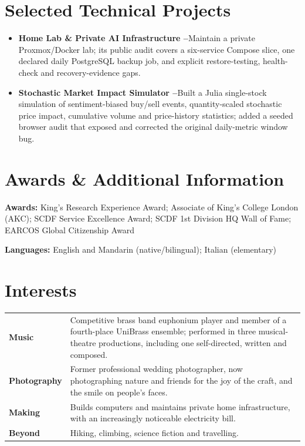 \documentclass[11pt,a4paper]{extarticle}
\newcommand{\project}[2]{\textbf{#1}\hspace{0.35em}#2}
\begin{document}
\section{Selected Technical Projects}
\begin{itemize}
  \item \project{Home Lab \& Private AI Infrastructure --}{Maintain a private Proxmox/Docker lab; its public audit covers a six-service Compose slice, one declared daily PostgreSQL backup job, and explicit restore-testing, health-check and recovery-evidence gaps.}
  \item \project{Stochastic Market Impact Simulator --}{Built a Julia single-stock simulation of sentiment-biased buy/sell events, quantity-scaled stochastic price impact, cumulative volume and price-history statistics; added a seeded browser audit that exposed and corrected the original daily-metric window bug.}
\end{itemize}

\section{Awards \& Additional Information}
\textbf{Awards:} King's Research Experience Award; Associate of King's College London (AKC); SCDF Service Excellence Award; SCDF 1st Division HQ Wall of Fame; EARCOS Global Citizenship Award

\textbf{Languages:} English and Mandarin (native/bilingual); Italian (elementary)

\section{Interests}
\begin{tabularx}{\textwidth}{@{}>{\bfseries}l@{\hspace{0.7em}}>{\raggedright\arraybackslash}X@{}}
Music & Competitive brass band euphonium player and member of a fourth-place UniBrass ensemble; performed in three musical-theatre productions, including one self-directed, written and composed.\\[1pt]
Photography & Former professional wedding photographer, now photographing nature and friends for the joy of the craft, and the smile on people's faces.\\[1pt]
Making & Builds computers and maintains private home infrastructure, with an increasingly noticeable electricity bill.\\[1pt]
Beyond & Hiking, climbing, science fiction and travelling.
\end{tabularx}
\end{document}
